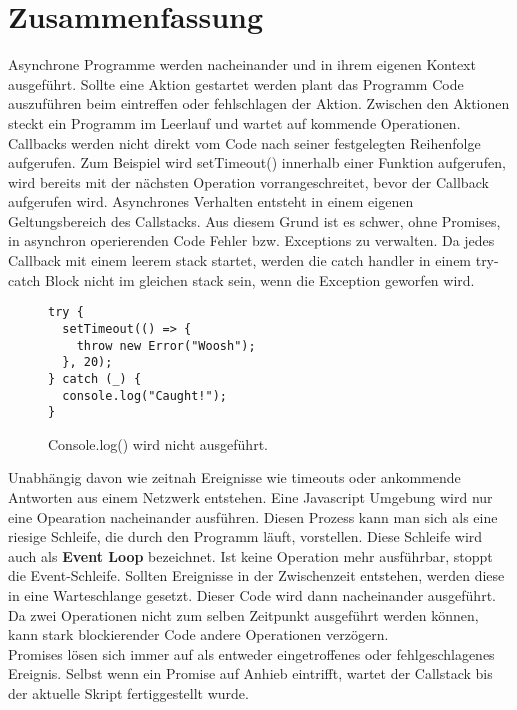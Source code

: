 \section{Zusammenfassung}
Asynchrone Programme werden nacheinander und in ihrem eigenen Kontext ausgeführt. Sollte eine Aktion gestartet werden plant das Programm Code auszuführen beim eintreffen oder fehlschlagen der Aktion. Zwischen den Aktionen steckt ein Programm im Leerlauf und wartet auf kommende Operationen.\\

\noindent
Callbacks werden nicht direkt vom Code nach seiner festgelegten Reihenfolge aufgerufen. Zum Beispiel wird setTimeout() innerhalb einer Funktion aufgerufen, wird bereits mit der nächsten Operation vorrangeschreitet, bevor der Callback aufgerufen wird. Asynchrones Verhalten entsteht in einem eigenen Geltungsbereich des Callstacks. Aus diesem Grund ist es schwer, ohne Promises, in asynchron operierenden Code Fehler bzw. Exceptions zu verwalten. Da jedes Callback mit einem leerem stack startet, werden die catch handler in einem try-catch Block nicht im gleichen stack sein, wenn die Exception geworfen wird.

\begin{figure}[H]
\begin{lstlisting}[basicstyle=\small]
try {
  setTimeout(() => {
    throw new Error("Woosh");
  }, 20);
} catch (_) {
  console.log("Caught!");
}
\end{lstlisting}
\caption{Console.log() wird nicht ausgeführt.}
\end{figure}

\noindent
Unabhängig davon wie zeitnah Ereignisse wie timeouts oder ankommende Antworten aus einem Netzwerk entstehen. Eine Javascript Umgebung wird nur eine Opearation nacheinander ausführen. Diesen Prozess kann man sich als eine riesige Schleife, die durch den Programm läuft, vorstellen. Diese Schleife wird auch als \textbf{Event Loop} bezeichnet. Ist keine Operation mehr ausführbar, stoppt die Event-Schleife. Sollten Ereignisse in der Zwischenzeit entstehen, werden diese in eine Warteschlange gesetzt. Dieser Code wird dann nacheinander ausgeführt. Da zwei Operationen nicht zum selben Zeitpunkt ausgeführt werden können, kann stark blockierender Code andere Operationen verzögern.\\

\noindent
Promises lösen sich immer auf als entweder eingetroffenes oder fehlgeschlagenes Ereignis. Selbst wenn ein Promise auf Anhieb eintrifft, wartet der Callstack bis der aktuelle Skript fertiggestellt wurde.

